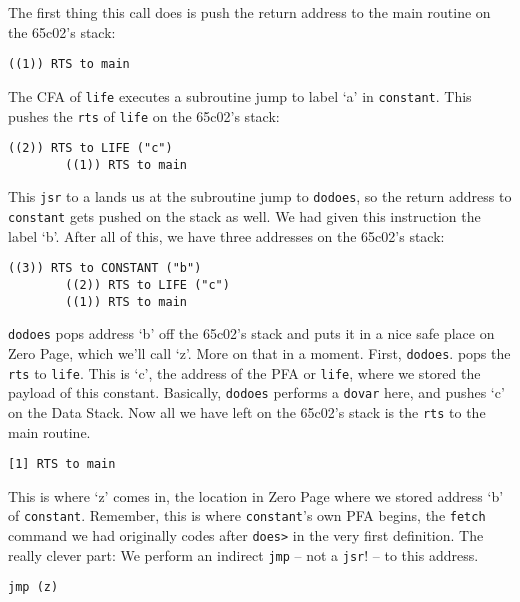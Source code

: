 The first thing this call does is push the return address to the main routine
on the 65c02's stack: 

\begin{lstlisting}[frame=single]
        ((1)) RTS to main
\end{lstlisting}

The CFA of \texttt{life} executes a subroutine jump to label `a' in
\texttt{constant}. This pushes the \texttt{rts} of \texttt{life} on the 65c02's
stack:

\begin{lstlisting}[frame=single]
        ((2)) RTS to LIFE ("c")
        ((1)) RTS to main
\end{lstlisting}

This \texttt{jsr} to a lands us at the subroutine jump to \texttt{dodoes}, so
the return address to \texttt{constant} gets pushed on the stack as well. We had
given this instruction the label `b'. After all of this, we have three addresses
on the 65c02's stack: 

\begin{lstlisting}[frame=single]
        ((3)) RTS to CONSTANT ("b") 
        ((2)) RTS to LIFE ("c") 
        ((1)) RTS to main
\end{lstlisting}

\texttt{dodoes} pops address `b' off the 65c02's stack and puts it in a nice
safe place on Zero Page, which we'll call `z'. More on that in a moment. First,
\texttt{dodoes}.  pops the \texttt{rts} to \texttt{life}. This is `c', the
address of the PFA or \texttt{life}, where we stored the payload of this
constant. Basically, \texttt{dodoes} performs a \texttt{dovar} here, and
pushes `c' on the Data Stack. Now all we have left on the 65c02's stack is the
\texttt{rts} to the main routine.  
 
\begin{lstlisting}[frame=single]
        [1] RTS to main
\end{lstlisting}

This is where `z' comes in, the location in Zero Page where we stored address
`b' of \texttt{constant}. Remember, this is where \texttt{constant}'s own PFA
begins, the \texttt{fetch} command we had originally codes after \texttt{does>}
in the very first definition. The really clever part: We perform an indirect
\texttt{jmp} -- not a \texttt{jsr}! -- to this address.

\begin{lstlisting}[frame=single]
        jmp (z) 
\end{lstlisting}

